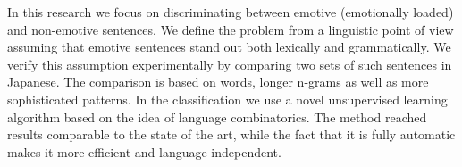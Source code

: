 In this research we focus on discriminating between emotive (emotionally loaded) and non-emotive sentences. We define the problem from a linguistic point of view assuming that emotive sentences stand out both lexically and grammatically. We verify this assumption experimentally by comparing two sets of such sentences in Japanese. The comparison is based on words, longer n-grams as well as more sophisticated patterns. In the classification we use a novel unsupervised learning algorithm based on the idea of language combinatorics. The method reached results comparable to the state of the art, while the fact that it is fully automatic makes it more efficient and language independent.
